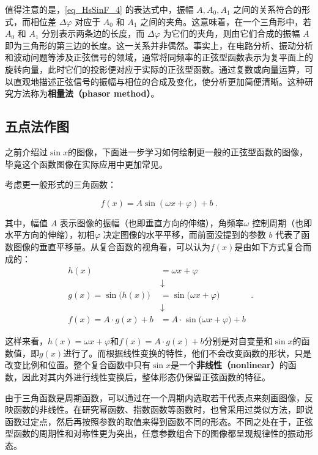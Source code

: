 值得注意的是，\autoref{eq_HsSinF_4} 的表达式中，振幅 $A, A_0, A_1$ 之间的关系符合的形式，而相位差 $\Delta \varphi$ 对应于 $A_0$ 和 $A_1$ 之间的夹角。这意味着，在一个三角形中，若 $A_0$ 和 $A_1$ 分别表示两条边的长度，而 $\Delta \varphi$ 为它们的夹角，则由它们合成的振幅 $A$ 即为三角形的第三边的长度。这一关系并非偶然。事实上，在电路分析、振动分析和波动问题等涉及正弦信号的领域，通常将同频率的正弦型函数表示为复平面上的旋转向量，此时它们的投影便对应于实际的正弦型函数。通过复数或向量运算，可以直观地描述正弦信号的振幅与相位的合成及变化，使分析更加简便清晰。这种研究方法称为\textbf{相量法（phasor method）}。

\subsection{五点法作图}

之前介绍过$\sin x$的图像，下面进一步学习如何绘制更一般的正弦型函数的图像，毕竟这个函数图像在实际应用中更加常见。

考虑更一般形式的三角函数：

\begin{equation}
f(x) = A \sin(\omega x + \varphi) + b~.
\end{equation}

其中，幅值 $A$ 表示图像的振幅（也即垂直方向的伸缩），角频率$\omega$ 控制周期（也即水平方向的伸缩），初相$\varphi$ 决定图像的水平平移，而前面没提到的参数 $b$ 代表了函数图像的垂直平移量。从复合函数的视角看，可以认为$f(x)$是由如下方式复合而成的：
\begin{equation}
\begin{split}
h(x) &= \omega x + \varphi \\
&\downarrow\\
g(x) = \sin\big(h(x)\big) &= \sin\big(\omega x + \varphi\big) \\
&\downarrow\\
f(x) = A \cdot g(x) + b &= A \cdot \sin\big(\omega x + \varphi\big) + b
\end{split}~.
\end{equation}

这样来看，$h(x)=\omega x + \varphi$和$f(x)=A \cdot g(x) + b$分别是对自变量和$\sin x$的函数值，即$g(x)$进行了。而根据线性变换的特性，他们不会改变函数的形状，只是改变比例和位置。整个复合函数中只有$\sin x$是一个\textbf{非线性（nonlinear）}的函数，因此对其内外进行线性变换后，整体形态仍保留正弦函数的特征。

由于三角函数是周期函数，可以通过在一个周期内选取若干代表点来刻画图像，反映函数的非线性。在研究幂函数、指数函数等函数时，也曾采用过类似方法，即说函数过定点，然后再按照参数的取值来得到函数不同的形态。不同之处在于，正弦型函数的周期性和对称性更为突出，任意参数组合下的图像都呈现规律性的振动形态。

